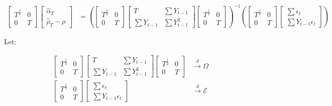 \documentclass[12pt]{article}
\begin{document}
\begin{align*}
    \begin{bmatrix}
        T^\frac{1}{2} & 0 \\ 0 & T
    \end{bmatrix}
    \begin{bmatrix}
        \hat{\alpha}_T\\ \hat{\rho}_T - \rho
    \end{bmatrix} &= \left(\begin{bmatrix}
        T^\frac{1}{2} & 0 \\ 0 & T
    \end{bmatrix}\begin{bmatrix}
        T & \sum Y_{t-1}\\ \sum Y_{t-1} & \sum Y^2_{t-1}
    \end{bmatrix}\begin{bmatrix}
        T^\frac{1}{2} & 0 \\ 0 & T
    \end{bmatrix}\right)^{-1}
    \left(\begin{bmatrix}
        T^\frac{1}{2} & 0 \\ 0 & T
    \end{bmatrix}\begin{bmatrix}
        \sum \epsilon_t \\ \sum Y_{t-1}\epsilon_t
    \end{bmatrix}\right)
\end{align*}

Let:

\begin{align*}
    \begin{bmatrix}
        T^\frac{1}{2} & 0 \\ 0 & T
    \end{bmatrix}\begin{bmatrix}
        T & \sum Y_{t-1}\\ \sum Y_{t-1} & \sum Y^2_{t-1}
    \end{bmatrix}\begin{bmatrix}
        T^\frac{1}{2} & 0 \\ 0 & T
    \end{bmatrix} &\xrightarrow{d} \Omega\\
    \begin{bmatrix}
        T^\frac{1}{2} & 0 \\ 0 & T
    \end{bmatrix}\begin{bmatrix}
        \sum \epsilon_t \\ \sum Y_{t-1}\epsilon_t
    \end{bmatrix} &\xrightarrow{d} \mathcal{E}
\end{align*}
\end{document}
